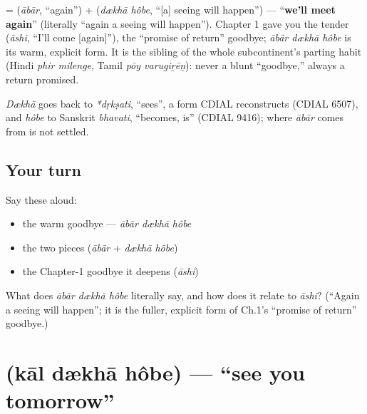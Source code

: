 \begin{cousinweb}
\textbf{  } = \textbf{} (\emph{ābār}, \textquotedblleft{}again\textquotedblright{}) + \textbf{ } (\emph{dækhā hôbe}, \textquotedblleft{}{[}a{]} seeing will happen\textquotedblright{}) — \textquotedblleft{}\textbf{we'll meet again}\textquotedblright{} (literally \textquotedblleft{}again a seeing will happen\textquotedblright{}). Chapter 1 gave you the tender \textbf{} (\emph{āshi}, \textquotedblleft{}I'll come {[}again{]}\textquotedblright{}), the \textquotedblleft{}promise of return\textquotedblright{} goodbye; \emph{ābār dækhā hôbe} is its warm, explicit form. It is the sibling of the whole subcontinent's parting habit (Hindi \emph{phir milenge}, Tamil \emph{pōy varugiṟēṉ}): never a blunt \textquotedblleft{}goodbye,\textquotedblright{} always a return promised.

\emph{Dækhā} goes back to \emph{*dṛkṣati}, \textquotedblleft{}sees\textquotedblright{}, a form CDIAL reconstructs (CDIAL 6507), and \emph{hôbe} to Sanskrit \emph{bhavati}, \textquotedblleft{}becomes, is\textquotedblright{} (CDIAL 9416); where \emph{ābār} comes from is not settled.
\end{cousinweb}

\subsection*{Your turn}
Say these aloud:

\begin{itemize}
\raggedright
  \item the warm goodbye — \emph{ābār dækhā hôbe}
  \item the two pieces (\emph{ābār} + \emph{dækhā hôbe})
  \item the Chapter-1 goodbye it deepens (\emph{āshi})
\end{itemize}

\begin{tcolorbox}[breakable,colback=teal!4,colframe=teal!35!black,title={Before you move on}]
What does \emph{ābār dækhā hôbe} literally say, and how does it relate to \emph{āshi}? (\textquotedblleft{}Again a seeing will happen\textquotedblright{}; it is the fuller, explicit form of Ch.1's \textquotedblleft{}promise of return\textquotedblright{} goodbye.)
\end{tcolorbox}
\section[\texorpdfstring{\bn{কাল} \bn{দেখা} \bn{হবে} (kāl dækhā hôbe)}{কাল দেখা হবে (kāl dækhā hôbe)}]{   (kāl dækhā hôbe) — \textquotedblleft{}see you tomorrow\textquotedblright{}}

